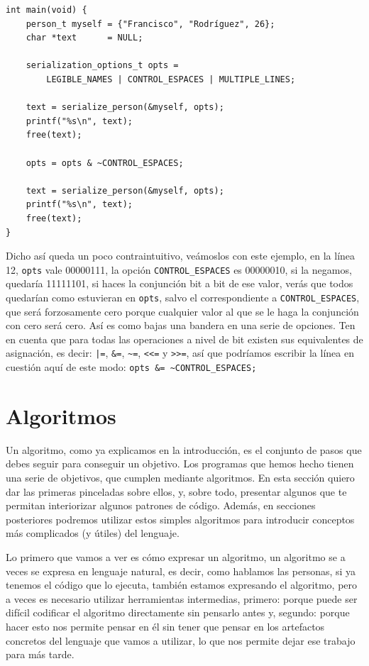 \documentclass[a4paper]{article}
\begin{document}
\noindent
\begin{minipage}[H]{\linewidth}
\mbox{}
\begin{lstlisting}[style=C, label={lst:setFlagOff},
caption={Ejemplo de bajada de una bandera}]
int main(void) {
    person_t myself = {"Francisco", "Rodríguez", 26};
    char *text      = NULL;

    serialization_options_t opts =
        LEGIBLE_NAMES | CONTROL_ESPACES | MULTIPLE_LINES;

    text = serialize_person(&myself, opts);
    printf("%s\n", text);
    free(text);

    opts = opts & ~CONTROL_ESPACES;

    text = serialize_person(&myself, opts);
    printf("%s\n", text);
    free(text);
}
\end{lstlisting}
\end{minipage}

Dicho así queda un poco contraintuitivo, veámoslos con este ejemplo, en la línea
12, \verb!opts! vale 00000111, la opción \verb!CONTROL_ESPACES! es 00000010,
si la negamos, quedaría 11111101, si haces la conjunción bit a bit de ese valor,
verás que todos quedarían como estuvieran en \verb!opts!, salvo el
correspondiente a \verb!CONTROL_ESPACES!, que será forzosamente cero porque
cualquier valor al que se le haga la conjunción con cero será cero.
Así es como bajas una bandera en una serie de opciones. Ten en cuenta que
para todas las operaciones a nivel de bit existen sus equivalentes de
asignación, es decir: \verb!|=!, \verb!&=!, \verb!~=!, \verb!<<=! y
\verb!>>=!, así que podríamos escribir la línea en cuestión aquí de este modo:
\lstinline[style=C]!opts &= ~CONTROL_ESPACES;!

\section{Algoritmos}
Un algoritmo, como ya explicamos en la introducción, es el conjunto de pasos
que debes seguir para conseguir un objetivo. Los programas que hemos hecho
tienen una serie de objetivos, que cumplen mediante algoritmos. En esta sección
quiero dar las primeras pinceladas sobre ellos, y, sobre todo, presentar
algunos que te permitan interiorizar algunos patrones de código. Además, en
secciones posteriores podremos utilizar estos simples algoritmos para introducir
conceptos más complicados (y útiles) del lenguaje.

Lo primero que vamos a ver es cómo expresar un algoritmo, un algoritmo se
a veces se expresa en lenguaje natural, es decir, como hablamos las personas,
si ya tenemos el código que lo ejecuta, también estamos expresando el algoritmo,
pero a veces es necesario utilizar herramientas intermedias, primero: porque
puede ser difícil codificar el algoritmo directamente sin pensarlo antes y,
segundo: porque hacer esto nos permite pensar en él sin tener que pensar en los
artefactos concretos del lenguaje que vamos a utilizar, lo que nos permite
dejar ese trabajo para más tarde.
\end{document}
